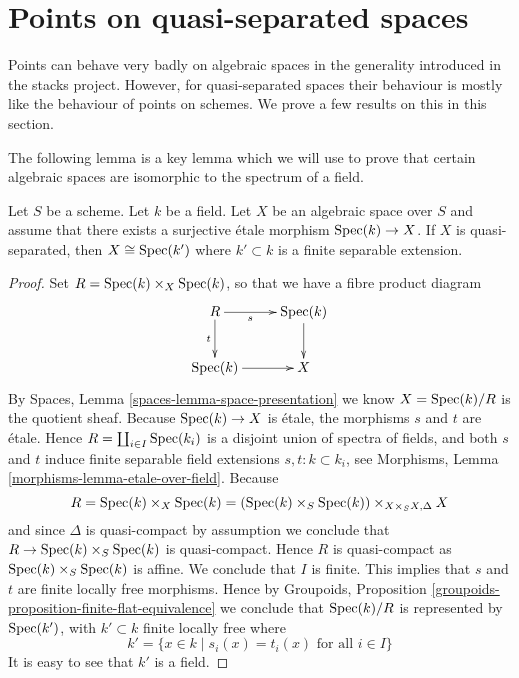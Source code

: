 \section{Points on quasi-separated spaces}
\label{section-points-quasi-separated}

\noindent
Points can behave very badly on algebraic spaces in the generality introduced
in the stacks project. However, for quasi-separated spaces their behaviour
is mostly like the behaviour of points on schemes. We prove a few results
on this in this section.

\medskip\noindent
The following lemma is a key lemma which we will use to prove that
certain algebraic spaces are isomorphic to the spectrum of a field.

\begin{lemma}
\label{lemma-point-like-spaces}
Let $S$ be a scheme. Let $k$ be a field.
Let $X$ be an algebraic space over $S$ and assume that there exists
a surjective \'etale morphism $\mathop{\rm Spec}(k) \to X$.
If $X$ is quasi-separated, then $X \cong \mathop{\rm Spec}(k')$
where $k' \subset k$ is a finite separable extension.
\end{lemma}

\begin{proof}
Set $R = \mathop{\rm Spec}(k) \times_X \mathop{\rm Spec}(k)$, so that we have a
fibre product diagram
$$
\xymatrix{
R \ar[r]_-s \ar[d]_-t & \Spec(k) \ar[d] \\
\Spec(k) \ar[r] & X
}
$$
By
Spaces, Lemma \ref{spaces-lemma-space-presentation}
we know $X = \mathop{\rm Spec}(k)/R$ is the quotient sheaf.
Because $\mathop{\rm Spec}(k) \to X$ is \'etale, the morphisms $s$ and $t$ are
\'etale. Hence $R = \coprod_{i \in I} \mathop{\rm Spec}(k_i)$ is a disjoint
union of spectra of fields, and both $s$ and $t$
induce finite separable field extensions $s, t : k \subset k_i$, see
Morphisms, Lemma \ref{morphisms-lemma-etale-over-field}.
Because
$$
R = \mathop{\rm Spec}(k) \times_X \mathop{\rm Spec}(k)
= (\mathop{\rm Spec}(k) \times_S \mathop{\rm Spec}(k)) \times_{X \times_S X, \Delta} X
$$
and since $\Delta$ is quasi-compact by assumption we conclude that
$R \to \mathop{\rm Spec}(k) \times_S \mathop{\rm Spec}(k)$ is quasi-compact.
Hence $R$ is quasi-compact as $\mathop{\rm Spec}(k) \times_S \mathop{\rm Spec}(k)$ is
affine. We conclude that $I$ is finite. This implies
that $s$ and $t$ are finite locally free morphisms. Hence by
Groupoids, Proposition \ref{groupoids-proposition-finite-flat-equivalence}
we conclude that $\mathop{\rm Spec}(k)/R$ is
represented by $\mathop{\rm Spec}(k')$, with $k' \subset k$ finite locally free
where
$$
k' = \{x \in k \mid s_i(x) = t_i(x)\text{ for all }i \in I\}
$$
It is easy to see that $k'$ is a field.
\end{proof}

